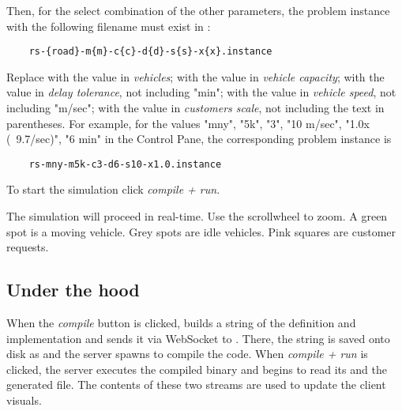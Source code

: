 Then, for the select combination of the other parameters, the problem instance
with the following filename must exist in :
\begin{verbatim}
    rs-{road}-m{m}-c{c}-d{d}-s{s}-x{x}.instance
\end{verbatim}
Replace  with the value in \textit{vehicles};  with the value
in \textit{vehicle capacity};  with the value in \textit{delay tolerance},
not including "min";  with the value in \textit{vehicle speed}, not including
"m/sec";  with the value in \textit{customers scale}, not including
the text in parentheses. For example, for the values "mny", "5k", "3", "10
m/sec", "1.0x (~9.7/sec)", "6 min" in the Control Pane, the corresponding
problem instance is
\begin{verbatim}
    rs-mny-m5k-c3-d6-s10-x1.0.instance
\end{verbatim}

To start the simulation click \textit{compile + run}.

The simulation will proceed in real-time. Use the scrollwheel to zoom.  A green
spot is a moving vehicle. Grey spots are idle vehicles.  Pink squares are
customer requests.


\subsection{Under the hood}
When the \textit{compile} button is clicked,
 builds a string of the definition and implementation
and sends it via WebSocket to . There, the string is
saved onto disk as  and the server spawns  to
compile the code. When \textit{compile + run} is clicked, the server
executes the compiled binary and begins to read its  and
the generated  file. The contents of these two
streams are used to update the client visuals.

